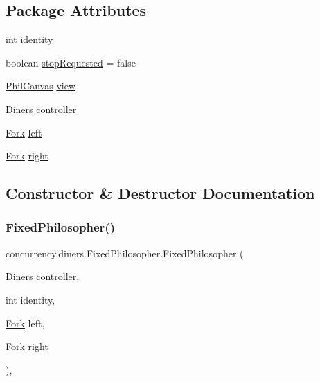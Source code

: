 \subsection*{Package Attributes}
\begin{DoxyCompactItemize}
\item 
int \mbox{\hyperlink{classconcurrency_1_1diners_1_1_fixed_philosopher_a13bd397cacaca012e3895178f7a2de94}{identity}}
\item 
boolean \mbox{\hyperlink{classconcurrency_1_1diners_1_1_fixed_philosopher_ab7f8863167a1215413af43b2bc8e3524}{stop\+Requested}} = false
\item 
\mbox{\hyperlink{classconcurrency_1_1diners_1_1_phil_canvas}{Phil\+Canvas}} \mbox{\hyperlink{classconcurrency_1_1diners_1_1_fixed_philosopher_af5da1a5ec888567bf35bad38b07ff28f}{view}}
\item 
\mbox{\hyperlink{classconcurrency_1_1diners_1_1_diners}{Diners}} \mbox{\hyperlink{classconcurrency_1_1diners_1_1_fixed_philosopher_a909154a6fbb8a9edde312f68d3198c9d}{controller}}
\item 
\mbox{\hyperlink{classconcurrency_1_1diners_1_1_fork}{Fork}} \mbox{\hyperlink{classconcurrency_1_1diners_1_1_fixed_philosopher_a1497025833df648aff2d8ede353aa78e}{left}}
\item 
\mbox{\hyperlink{classconcurrency_1_1diners_1_1_fork}{Fork}} \mbox{\hyperlink{classconcurrency_1_1diners_1_1_fixed_philosopher_acb8d793707783eb15a614bd2d8c0abc3}{right}}
\end{DoxyCompactItemize}


\subsection{Constructor \& Destructor Documentation}
\mbox{\label{classconcurrency_1_1diners_1_1_fixed_philosopher_a48572321c18f10ca554d0caa42adea3e}} 
\subsubsection{\texorpdfstring{Fixed\+Philosopher()}{FixedPhilosopher()}}
{\footnotesize\ttfamily concurrency.\+diners.\+Fixed\+Philosopher.\+Fixed\+Philosopher (\begin{DoxyParamCaption}\item[{\mbox{\hyperlink{classconcurrency_1_1diners_1_1_diners}{Diners}}}]{controller,  }\item[{int}]{identity,  }\item[{\mbox{\hyperlink{classconcurrency_1_1diners_1_1_fork}{Fork}}}]{left,  }\item[{\mbox{\hyperlink{classconcurrency_1_1diners_1_1_fork}{Fork}}}]{right }\end{DoxyParamCaption})\hspace{0.3cm}{\ttfamily [inline]}, {\ttfamily [package]}}


